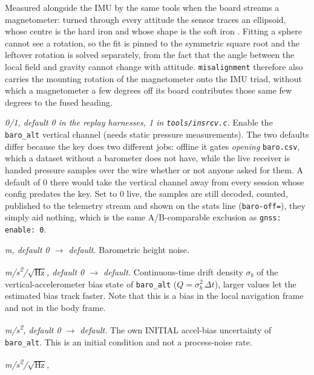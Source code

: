 \documentclass[11pt,a4paper]{article}
\newcommand{\code}[1]{\texttt{#1}}
\begin{document}
\begin{description}
    Measured alongside the IMU by the same tools when the board streams a
    magnetometer: turned through every attitude the sensor traces an
    ellipsoid, whose centre is the hard iron and whose shape is the soft
    iron \cite{zwiener2019}. Fitting a sphere cannot see a rotation, so the fit is pinned to
    the symmetric square root and the leftover rotation is solved
    separately, from the fact that the angle between the local field and
    gravity cannot change with attitude. \code{misalignment} therefore also
    carries the mounting rotation of the magnetometer onto the IMU triad,
    without which a magnetometer a few degrees off its board contributes
    those same few degrees to the fused heading.
  \item[\code{baro: enable}] \emph{0/1, default 0 in the replay harnesses,
    1 in \code{tools/insrcv.c}.} Enable the \code{baro\_\allowbreak{}alt}
    vertical channel (needs static pressure measurements). The two defaults
    differ because the key does two different jobs: offline it gates
    \emph{opening} \code{baro.csv}, which a dataset without a barometer does
    not have, while the live receiver is handed pressure samples over the wire
    whether or not anyone asked for them. A default of 0 there would take
    the vertical channel away from every session whose config predates the
    key. Set to 0 live, the samples are still decoded, counted, published to
    the telemetry stream and shown on the stats line (\code{baro-off=}), they
    simply aid nothing, which is the same A/B-comparable exclusion as
    \code{gnss: enable: 0}.
  \item[\code{baro: stddev\_\allowbreak{}m}] \emph{m, default 0 $\to$ default.} Barometric
    height noise.
  \item[\code{baro: acc\_\allowbreak{}bias\_\allowbreak{}rw}] \emph{m/s\textsuperscript{2}/$\sqrt{\text{Hz}}$,
    default 0 $\to$ default.} Continuous-time drift
    density $\sigma_b$ of the vertical-accelerometer bias state of
    \code{baro\_\allowbreak{}alt} ($Q = \sigma_b^2\,\Delta t$), larger values let
    the estimated bias track faster. Note that this is a bias in the local
    navigation frame and not in the body frame.
  \item[\code{baro: acc\_\allowbreak{}bias\_\allowbreak{}init\_\allowbreak{}mps2}] \emph{m/s\textsuperscript{2},
    default 0 $\to$ default.} The own INITIAL accel-bias uncertainty of
    \code{baro\_\allowbreak{}alt}. This is an initial condition and not a
    process-noise rate.
  \item[\code{baro: acc\_\allowbreak{}noise\_\allowbreak{}mps2\_\allowbreak{}sqrthz}] \emph{m/s\textsuperscript{2}/$\sqrt{\text{Hz}}$,
}
\end{description}
\end{document}
